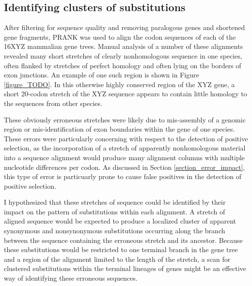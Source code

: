 \subsection{Identifying clusters of \nsyn substitutions}
\label{section_windows_clustered_subs}

After filtering for sequence quality and removing paralogous genes and
shortened gene fragments, PRANK was used to align the codon sequences
of each of the 16XYZ mammalian gene trees. Manual analysis of a number
of these alignments revealed many short stretches of clearly
nonhomologous sequence in one species, often flanked by stretches of
perfect homology and often lying on the borders of exon junctions. An
example of one such region is shown in Figure \ref{figure_TODO}. In
this otherwise highly conserved region of the XYZ gene, a short
20-codon stretch of the XYZ sequence appears to contain little
homology to the sequences from other species.

These obviously erroneous stretches were likely due to mis-assembly of
a genomic region or mis-identification of exon boundaries within the
gene of one species. These errors were particularly concerning with
respect to the detection of positive selection, as the incorporation
of a stretch of apparently nonhomologous material into a sequence
alignment would produce many alignment columns with multiple
nucleotide differences per codon. As discussed in Section
\ref{section_error_impact}, this type of error is particuarly prone to
cause false positives in the detection of positive selection.

I hypothesized that these stretches of \nhom sequence could be
identified by their impact on the pattern of substitutions within each
alignment. A stretch of \nhom aligned sequence would be expected to
produce a localized cluster of apparent synonymous and nonsynonymous
substitutions occurring along the branch between the sequence
containing the erroneous stretch and its ancestor. Because these
substitutions would be restricted to one terminal branch in the gene
tree and a region of the alignment limited to the length of the \nhom
stretch, a scan for clustered substitutions within the terminal
lineages of genes might be an effective way of identifying these
erroneous sequences.

